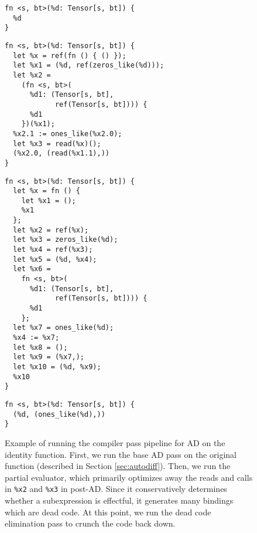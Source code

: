 \begin{figure}
  \centering
    \begin{verbatim}
fn <s, bt>(%d: Tensor[s, bt]) {
  %d
}
    \end{verbatim}


    \begin{verbatim}
fn <s, bt>(%d: Tensor[s, bt]) {
  let %x = ref(fn () { () });
  let %x1 = (%d, ref(zeros_like(%d)));
  let %x2 =
    (fn <s, bt>(
      %d1: (Tensor[s, bt],
            ref(Tensor[s, bt]))) {
      %d1
    })(%x1);
  %x2.1 := ones_like(%x2.0);
  let %x3 = read(%x)();
  (%x2.0, (read(%x1.1),))
}
    \end{verbatim}

    \begin{verbatim}
fn <s, bt>(%d: Tensor[s, bt]) {
  let %x = fn () {
    let %x1 = ();
    %x1
  };
  let %x2 = ref(%x);
  let %x3 = zeros_like(%d);
  let %x4 = ref(%x3);
  let %x5 = (%d, %x4);
  let %x6 =
    fn <s, bt>(
      %d1: (Tensor[s, bt],
            ref(Tensor[s, bt]))) {
      %d1
    };
  let %x7 = ones_like(%d);
  %x4 := %x7;
  let %x8 = ();
  let %x9 = (%x7,);
  let %x10 = (%d, %x9);
  %x10
}
    \end{verbatim}


    \begin{verbatim}
fn <s, bt>(%d: Tensor[s, bt]) {
  (%d, (ones_like(%d),))
}
  \end{verbatim}
  \caption{
    Example of running the compiler pass pipeline for AD on the identity
    function.
    First, we run the base AD pass on the original function (described in Section \ref{sec:autodiff}).
    Then, we run the partial evaluator,
      which primarily optimizes away the reads and calls in \texttt{\%x2} and
      \texttt{\%x3} in post-AD.
    Since it conservatively determines whether a subexpression is effectful,
      it generates many bindings which are dead code.
    At this point, we run the dead code elimination pass to crunch the code back down.
  }
  \label{fig:pe-example}
\end{figure}
